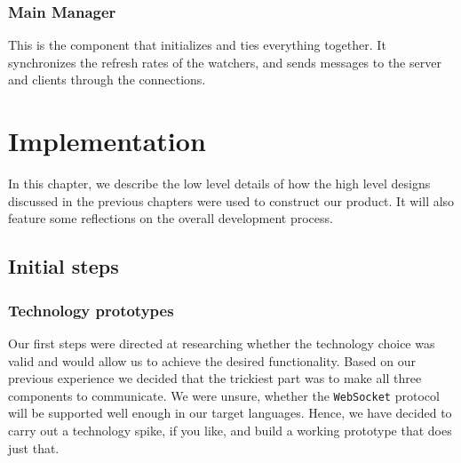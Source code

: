 \documentclass{l3proj}
\begin{document}
\subsection{Main Manager}
This is the component that initializes and ties everything together. It synchronizes the refresh rates of the watchers, and sends messages to the server and clients through the connections.



\chapter{Implementation}
\label{impl}

In this chapter, we describe the low level details of how the high level designs discussed in the previous chapters were used to construct our product. It will also feature some reflections on the overall development process.


\section{Initial steps}

\subsection{Technology prototypes}


Our first steps were directed at researching whether the technology choice was valid and would allow us to achieve the desired functionality. Based on our previous experience we decided that the trickiest part was to make all three components to communicate. We were unsure, whether the \texttt{WebSocket} protocol will be supported well enough in our target languages. Hence, we have decided to carry out a technology spike, if you like, and build a working prototype that does just that.
\end{document}
